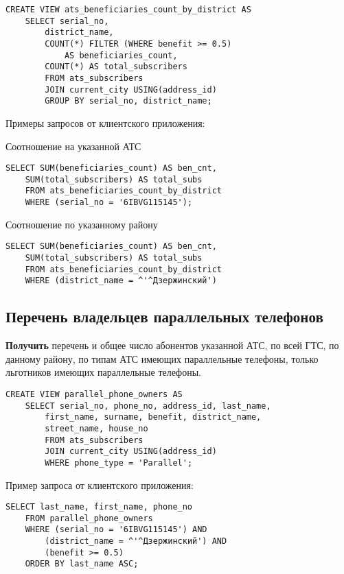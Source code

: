 \documentclass{report}
\begin{document}
\begin{lstlisting}
CREATE VIEW ats_beneficiaries_count_by_district AS 
    SELECT serial_no,  
        district_name,  
        COUNT(*) FILTER (WHERE benefit >= 0.5) 
            AS beneficiaries_count, 
        COUNT(*) AS total_subscribers
        FROM ats_subscribers
        JOIN current_city USING(address_id)
        GROUP BY serial_no, district_name;
\end{lstlisting}

Примеры запросов от клиентского приложения:

Соотношение на указанной АТС
\begin{lstlisting}
SELECT SUM(beneficiaries_count) AS ben_cnt, 
    SUM(total_subscribers) AS total_subs
	FROM ats_beneficiaries_count_by_district
	WHERE (serial_no = '6IBVG115145');
\end{lstlisting}

Соотношение по указанному району
\begin{lstlisting}
SELECT SUM(beneficiaries_count) AS ben_cnt, 
    SUM(total_subscribers) AS total_subs
	FROM ats_beneficiaries_count_by_district
	WHERE (district_name = ^'^Дзержинский')
\end{lstlisting}

\subsection{Перечень владельцев параллельных телефонов}

\textbf{Получить} перечень и общее число абонентов указанной АТС, 
по всей ГТС, по данному району, по типам АТС имеющих параллельные телефоны, 
только льготников имеющих параллельные телефоны.

\begin{lstlisting}
CREATE VIEW parallel_phone_owners AS
    SELECT serial_no, phone_no, address_id, last_name, 
        first_name, surname, benefit, district_name, 
        street_name, house_no
        FROM ats_subscribers
        JOIN current_city USING(address_id)
        WHERE phone_type = 'Parallel';
\end{lstlisting}

Пример запроса от клиентского приложения:

\begin{lstlisting}
SELECT last_name, first_name, phone_no
	FROM parallel_phone_owners
	WHERE (serial_no = '6IBVG115145') AND
		(district_name = ^'^Дзержинский') AND
		(benefit >= 0.5)
	ORDER BY last_name ASC;
\end{lstlisting}
\end{document}
